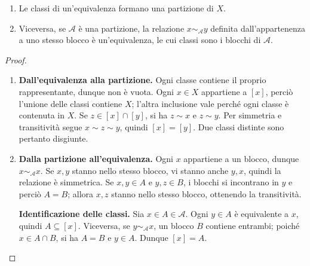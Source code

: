 \begin{teorema}\label{teo:partizioni}
\begin{enumerate}[label=\arabic*.]
\item Le classi di un'equivalenza formano una partizione di $X$.
\item Viceversa, se $\mathcal A$ è una partizione, la relazione $x\sim_{\mathcal A}y$ definita dall'appartenenza a uno stesso blocco è un'equivalenza, le cui classi sono i blocchi di $\mathcal A$.
\end{enumerate}
\end{teorema}
\begin{proof}
\begin{enumerate}[label=\arabic*.]
\item \textbf{Dall'equivalenza alla partizione.} Ogni classe contiene il proprio rappresentante, dunque non è vuota. Ogni $x\in X$ appartiene a $[x]$, perciò l'unione delle classi contiene $X$; l'altra inclusione vale perché ogni classe è contenuta in $X$. Se $z\in[x]\cap[y]$, si ha $z\sim x$ e $z\sim y$. Per simmetria e transitività segue $x\sim z\sim y$, quindi $[x]=[y]$. Due classi distinte sono pertanto disgiunte.
\item \textbf{Dalla partizione all'equivalenza.} Ogni $x$ appartiene a un blocco, dunque $x\sim_{\mathcal A}x$. Se $x,y$ stanno nello stesso blocco, vi stanno anche $y,x$, quindi la relazione è simmetrica. Se $x,y\in A$ e $y,z\in B$, i blocchi si incontrano in $y$ e perciò $A=B$; allora $x,z$ stanno nello stesso blocco, ottenendo la transitività.

\textbf{Identificazione delle classi.} Sia $x\in A\in\mathcal A$. Ogni $y\in A$ è equivalente a $x$, quindi $A\subseteq[x]$. Viceversa, se $y\sim_{\mathcal A}x$, un blocco $B$ contiene entrambi; poiché $x\in A\cap B$, si ha $A=B$ e $y\in A$. Dunque $[x]=A$.
\end{enumerate}
\end{proof}

\begin{schema}
\end{schema}

